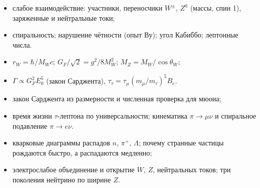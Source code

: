 \begin{examcheck}
\begin{itemize}
 \item слабое взаимодействие: участники, переносчики $W^\pm$, $Z^0$ (массы, спин 1), заряженные и нейтральные токи;
 \item спиральность; нарушение чётности (опыт Ву); угол Кабиббо; лептонные числа.
\end{itemize}
\begin{itemize}
 \item $r_W=\hbar/M_Wc$; $G_F/\sqrt2=g^2/8M_W^2$; $M_Z=M_W/\cos\theta_W$;
 \item $\Gamma\propto G_F^2E_0^5$ (закон Сарджента), $\tau_\tau=\tau_\mu(m_\mu/m_\tau)^5B_e$.
\end{itemize}
\begin{itemize}
 \item закон Сарджента из размерности и численная проверка для мюона;
 \item время жизни $\tau$-лептона по универсальности; кинематика $\pi\to\mu\nu$ и спиральное подавление $\pi\to e\nu$.
\end{itemize}
\begin{itemize}
 \item кварковые диаграммы распадов $n$, $\pi^+$, $\Lambda$; почему странные частицы рождаются быстро, а распадаются медленно;
 \item электрослабое объединение и открытие $W$, $Z$, нейтральных токов; три поколения нейтрино по ширине $Z$.
\end{itemize}
\end{examcheck}
